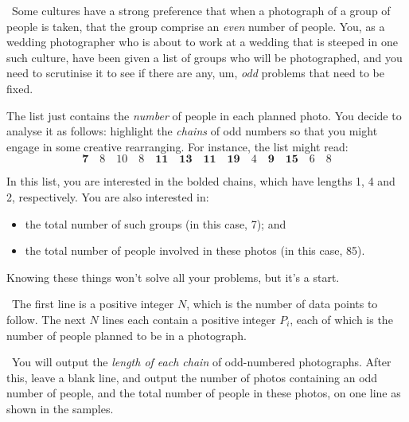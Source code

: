 

\Question\ Some cultures have a strong preference that when a photograph of a group of
people is taken, that the group comprise an \emph{even} number of people. You, as a
wedding photographer who is about to work at a wedding that is steeped in one such
culture, have been given a list of groups who will be photographed, and you need to
scrutinise it to see if there are any, um, \emph{odd} problems that need to be fixed.

The list just contains the \emph{number} of people in each planned photo. You decide to
analyse it as follows: highlight the \emph{chains} of odd numbers so that you might engage
in some creative rearranging. For instance, the list might read: \[
  \mathbf{7}
  \quad 8 \quad 10 \quad 8
  \quad \mathbf{11} \quad \mathbf{13} \quad \mathbf{11} \quad \mathbf{19}
  \quad 4
  \quad \mathbf{9} \quad \mathbf{15}
  \quad 6 \quad 8
\]

In this list, you are interested in the bolded chains, which have lengths 1, 4 and 2,
respectively. You are also interested in:
\begin{itemize}
  \item the total number of such groups (in this case, 7); and
  \item the total number of people involved in these photos (in this case, 85).
\end{itemize}

Knowing these things won't solve all your problems, but it's a start.

\Input\ The first line is a positive integer $N$, which is the number of data points to
follow. The next $N$ lines each contain a positive integer $P_i$, each of which is the
number of people planned to be in a photograph.

\Output\ You will output the \emph{length of each chain} of odd-numbered photographs.
After this, leave a blank line, and output the number of photos containing an odd number
of people, and the total number of people in these photos, on one line as shown in the
samples.

\Sample

